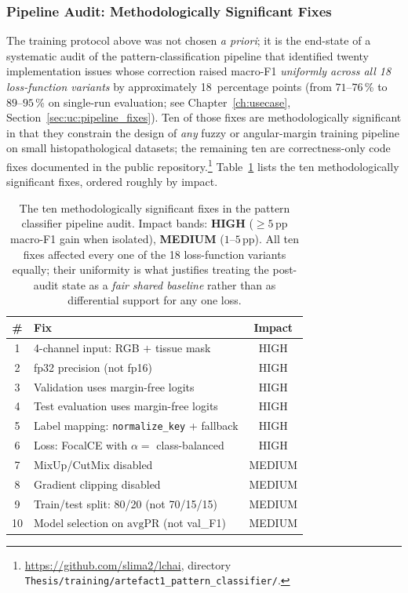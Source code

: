 \subsubsection{Pipeline Audit: Methodologically Significant Fixes}
\label{sec:meth:pattern:pipeline_audit}

The training protocol above was not chosen \emph{a priori}; it is the
end-state of a systematic audit of the pattern-classification pipeline
that identified twenty implementation issues whose correction raised
macro-F1 \emph{uniformly across all 18 loss-function variants} by
approximately 18~percentage points
(from $71$--$76$\,\% to $89$--$95$\,\% on single-run evaluation;
see Chapter~\ref{ch:usecase}, Section~\ref{sec:uc:pipeline_fixes}).
Ten of those fixes are methodologically significant in that they
constrain the design of \emph{any} fuzzy or angular-margin training
pipeline on small histopathological datasets; the remaining ten are
correctness-only code fixes documented in the public
repository.\footnote{\url{https://github.com/slima2/lchai}, directory
\texttt{Thesis/training/artefact1\_pattern\_classifier/}.}
Table~\ref{tab:pipeline_fixes} lists the ten methodologically
significant fixes, ordered roughly by impact.

\begin{table}[ht!]
\centering
\small
\caption{The ten methodologically significant fixes in the pattern
classifier pipeline audit.
Impact bands: \textbf{HIGH} ($\geq 5$\,pp macro-F1 gain when
isolated), \textbf{MEDIUM} ($1$--$5$\,pp).
All ten fixes affected every one of the 18 loss-function variants
equally; their uniformity is what justifies treating the post-audit
state as a \emph{fair shared baseline} rather than as differential
support for any one loss.}
\label{tab:pipeline_fixes}
\begin{tabular}{c l c}
\hline
\textbf{\#} & \textbf{Fix} & \textbf{Impact} \\
\hline
1  & 4-channel input: RGB $+$ tissue mask                & HIGH \\
2  & fp32 precision (not fp16)                            & HIGH \\
3  & Validation uses margin-free logits                   & HIGH \\
4  & Test evaluation uses margin-free logits              & HIGH \\
5  & Label mapping: \texttt{normalize\_key} + fallback    & HIGH \\
6  & Loss: FocalCE with $\alpha = $ class-balanced        & HIGH \\
7  & MixUp/CutMix disabled                                & MEDIUM \\
8  & Gradient clipping disabled                           & MEDIUM \\
9  & Train/test split: 80/20 (not 70/15/15)               & MEDIUM \\
10 & Model selection on $\mathrm{avgPR}$ (not val\_F1)    & MEDIUM \\
\hline
\end{tabular}
\end{table}

